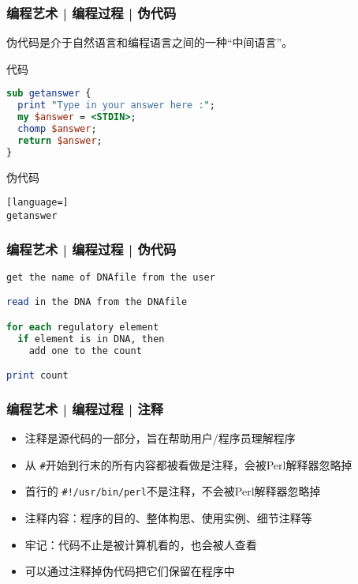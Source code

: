 \begin{frame}[fragile]
  \frametitle{编程艺术 | 编程过程 | 伪代码}
伪代码是介于自然语言和编程语言之间的一种“中间语言”。
  \begin{block}{代码}
\begin{lstlisting}[language=Perl]
sub getanswer {
  print "Type in your answer here :";  
  my $answer = <STDIN>;
  chomp $answer;
  return $answer;
}
\end{lstlisting}
\end{block}
\pause
\begin{block}{伪代码}
\begin{lstlisting}[language=]
getanswer
\end{lstlisting}
\end{block}
\end{frame}

\begin{frame}[fragile]
  \frametitle{编程艺术 | 编程过程 | \alert{伪代码}}
\begin{lstlisting}[language=Perl]
get the name of DNAfile from the user

read in the DNA from the DNAfile

for each regulatory element
  if element is in DNA, then
    add one to the count

print count
\end{lstlisting}
\end{frame}

\begin{frame}[fragile]
  \frametitle{编程艺术 | 编程过程 | \alert{注释}}
  \begin{itemize}
    \item 注释是源代码的一部分，旨在帮助用户/程序员理解程序
    \item 从 \verb|#|开始到行末的所有内容都被看做是注释，会被Perl解释器忽略掉
    \item 首行的 \verb|#!/usr/bin/perl|不是注释，不会被Perl解释器忽略掉
    \item 注释内容：程序的目的、整体构思、使用实例、细节注释等
    \item 牢记：代码不止是被计算机看的，也会被人查看
    \item 可以通过注释掉伪代码把它们保留在程序中
  \end{itemize}
\end{frame}

